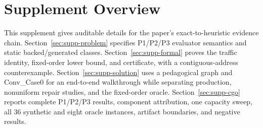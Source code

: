 \section*{Supplement Overview}
This supplement gives auditable details for the paper's exact-to-heuristic evidence chain. Section~\ref{sec:supp-problem} specifies P1/P2/P3 evaluator semantics and static backed/generated classes. Section~\ref{sec:supp-formal} proves the traffic identity, fixed-order lower bound, and certificate, with a contiguous-address counterexample. Section~\ref{sec:supp-solution} uses a pedagogical graph and Conv\_Case0 for an end-to-end walkthrough while separating production, nonuniform repair studies, and the fixed-order oracle. Section~\ref{sec:supp-cgo} reports complete P1/P2/P3 results, component attribution, one capacity sweep, all 36 synthetic and eight oracle instances, artifact boundaries, and negative results.
